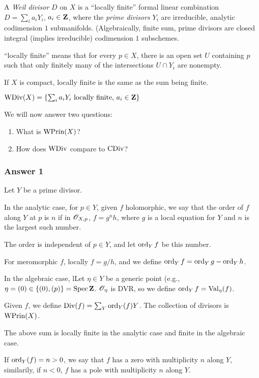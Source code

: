 \begin{definition}
  A \emph{Weil divisor} $D$ on $X$ is a ``locally finite'' formal linear combination $D = \sum_i a_i Y_i$, $a_i \in \mathbf{Z}$, where the \emph{prime divisors} $Y_i$ are irreducible, analytic codimension $1$ submanifolds. (Algebraically, finite sum, prime divisors are closed integral (implies irreducible) codimension $1$ subschemes.

``locally finite'' means that for every $p \in X$, there is an open set $U$ containing $p$ such that only finitely many of the intersections $U \cap Y_i$ are nonempty. 

If $X$ is compact, locally finite is the same as the sum being finite.

$\operatorname{WDiv}(X) = \{\sum_i a_i Y_i \text{ locally finite, $a_i \in \mathbf{Z}$}  \}$
\end{definition}
We will now answer two questions:
\begin{enumerate}
\item What is $\operatorname{WPrin}(X)$?
\item How does $\operatorname{WDiv}$ compare to $\operatorname{CDiv}$?
\end{enumerate}
\subsubsection{Answer 1}
Let $Y$ be a prime divisor. 

In the analytic case, for $p \in Y$, given $f$ holomorphic, we say that the order of $f$ along $Y$ at $p$ is $n$ if in $\mathscr{O}_{X,p}$, $f = g^nh$, where $g$ is a local equation for $Y$ and $n$ is the largest such number.
\begin{fact}
  The order is independent of $p \in Y$, and let $\operatorname{ord}_Y f$ be this number.
\end{fact}
For meromorphic $f$, locally $f = g/h$, and we define $\operatorname{ord}_Y f = \operatorname{ord}_Y g - \operatorname{ord}_Y h$.

In the algebraic case, lLet $\eta \in Y$ be a generic point (e.g., $\eta = (0) \in \{(0), (p)\} = \operatorname{Spec} \mathbf{Z}$. $\mathscr{O}_\eta$ is DVR, so we define $\operatorname{ord}_Y f = \operatorname{Val}_\eta(f)$. 

Given $f$, we define $\operatorname{Div}(f) = \sum_Y \operatorname{ord}_Y(f) Y$. The collection of divisors is $\operatorname{WPrin}(X)$.
\begin{fact}
  The above sum is locally finite in the analytic case and finite in the algebraic case.
\end{fact}
If $\operatorname{ord}_Y(f) = n > 0$, we say that $f$ has a zero with multiplicity $n$ along $Y$, similarily, if $n < 0$, $f$ has a pole with multiplicity $n$ along $Y$.

